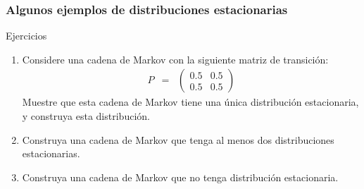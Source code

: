 \begin{frame}
\frametitle{Algunos ejemplos de distribuciones estacionarias}

{\footnotesize

\begin{exampleblock}{Ejercicios}
\begin{enumerate}
\item Considere una cadena de Markov con la siguiente matriz de transición:
\begin{eqnarray*}
P & = & \begin{pmatrix}
0\text{.}5 & 0\text{.}5\\
0\text{.}5 & 0\text{.}5
\end{pmatrix}
\end{eqnarray*}
Muestre que esta cadena de Markov tiene una única distribución estacionaria, y construya esta distribución.


\item Construya una cadena de Markov que tenga al menos dos distribuciones estacionarias.


\item Construya una cadena de Markov que no tenga distribución estacionaria.
\end{enumerate}

\end{exampleblock}

}

\end{frame}

